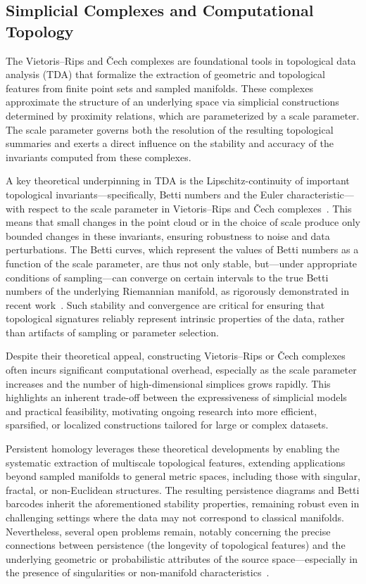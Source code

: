 \documentclass[sigconf]{acmart}
\begin{document}
\subsection{Simplicial Complexes and Computational Topology}

The Vietoris–Rips and Čech complexes are foundational tools in topological data analysis (TDA) that formalize the extraction of geometric and topological features from finite point sets and sampled manifolds. These complexes approximate the structure of an underlying space via simplicial constructions determined by proximity relations, which are parameterized by a scale parameter. The scale parameter governs both the resolution of the resulting topological summaries and exerts a direct influence on the stability and accuracy of the invariants computed from these complexes.

A key theoretical underpinning in TDA is the Lipschitz-continuity of important topological invariants—specifically, Betti numbers and the Euler characteristic—with respect to the scale parameter in Vietoris–Rips and Čech complexes~\cite{ref88}. This means that small changes in the point cloud or in the choice of scale produce only bounded changes in these invariants, ensuring robustness to noise and data perturbations. The Betti curves, which represent the values of Betti numbers as a function of the scale parameter, are thus not only stable, but—under appropriate conditions of sampling—can converge on certain intervals to the true Betti numbers of the underlying Riemannian manifold, as rigorously demonstrated in recent work~\cite{ref88}. Such stability and convergence are critical for ensuring that topological signatures reliably represent intrinsic properties of the data, rather than artifacts of sampling or parameter selection.

Despite their theoretical appeal, constructing Vietoris–Rips or Čech complexes often incurs significant computational overhead, especially as the scale parameter increases and the number of high-dimensional simplices grows rapidly. This highlights an inherent trade-off between the expressiveness of simplicial models and practical feasibility, motivating ongoing research into more efficient, sparsified, or localized constructions tailored for large or complex datasets.

Persistent homology leverages these theoretical developments by enabling the systematic extraction of multiscale topological features, extending applications beyond sampled manifolds to general metric spaces, including those with singular, fractal, or non-Euclidean structures. The resulting persistence diagrams and Betti barcodes inherit the aforementioned stability properties, remaining robust even in challenging settings where the data may not correspond to classical manifolds. Nevertheless, several open problems remain, notably concerning the precise connections between persistence (the longevity of topological features) and the underlying geometric or probabilistic attributes of the source space—especially in the presence of singularities or non-manifold characteristics~\cite{ref88}.
\end{document}

